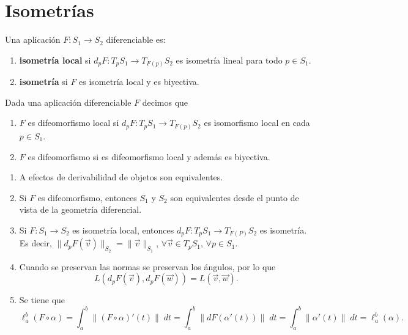 \section{Isometrías}
\begin{definition}[Isometría]
Una aplicación $\displaystyle F : S_{1}\to S_{2} $ diferenciable es:
\begin{enumerate}
\item \textbf{isometría local} si $\displaystyle d _{p}F : T_{p}S_{1}\to T_{F\left(p\right)}S_{2} $ es isometría lineal para todo $\displaystyle p \in S_{1} $. 
\item \textbf{isometría} si $\displaystyle F $ es isometría local y es biyectiva.
\end{enumerate}
\end{definition}
\begin{definition}
Dada una aplicación diferenciable $\displaystyle F $ decimos que 
\begin{enumerate}
\item $\displaystyle F $ es difeomorfismo local si $\displaystyle d _{p}F : T_{p}S_{1}\to T_{F\left(p\right)}S_{2} $ es isomorfismo local en cada $\displaystyle p \in S_{1} $. 
\item $\displaystyle F $ es difeomorfismo si es difeomorfismo local y además es biyectiva.
\end{enumerate}
\end{definition}
\begin{observation}
\begin{enumerate}
\item A efectos de derivabilidad de objetos son equivalentes. 
\item Si $\displaystyle F $ es difeomorfismo, entonces $\displaystyle S_{1} $ y $\displaystyle S_{2} $ son equivalentes desde el punto de vista de la geometría diferencial.
\item Si $\displaystyle F: S_{1}\to S_{2} $ es isometría local, entonces $\displaystyle d _{p}F : T_{p}S_{1} \to T_{F\left(P\right)}S_{2} $ es isometría. Es decir, $\displaystyle \|d _{p}F\left(\vec{v}\right)\|_{S_{2}}=\|\vec{v}\|_{S_{1}} $, $\displaystyle \forall \vec{v}\in T_{p}S_{1} $, $\displaystyle \forall p \in S_{1} $. 
\item Cuando se preservan las normas se preservan los ángulos, por lo que 
	\[L\left(d _{p}F\left(\vec{v}\right), d _{p}F\left(\vec{w}\right)\right)=L\left(\vec{v}, \vec{w}\right) .\]
\item Se tiene que 
	\[\ell^{b}_{a}\left(F\circ \alpha \right)=\int^{b}_{a} \|\left(F\circ \alpha \right)'\left(t\right)\| \; dt = \int^{b}_{a} \| dF\left(\alpha'\left(t\right)\right)\| \; dt = \int^{b}_{a} \|\alpha'\left(t\right)\| \; dt = \ell^{b}_{a}\left(\alpha \right) .\]
\end{enumerate}
\end{observation}

